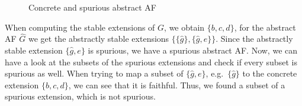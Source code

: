 \begin{example}
\begin{figure}[h]
\begin{subfigure}[t]{0.45\textwidth}
\begin{tikzpicture}
    \end{tikzpicture}
    \label{af:implementationRefutedTheoryB}
    \end{subfigure}%
\caption{Concrete and spurious abstract AF}
\label{fig:AlgorithmRefutedTheoryDefinition}
\end{figure}
\vspace{0.3cm}

When computing the stable extensions of $G$, we obtain $\bigl\{b, c, d\bigl\}$, for the abstract AF $\hat{G}$ we get the abstractly stable extensions $\big\{\{\hat{g}\}, \{\hat{g}, e\}\big\}$. Since the abstractly stable extension $\{\hat{g}, e\}$ is spurious, we have a spurious abstract AF. Now, we can have a look at the subsets of the spurious extensions and check if every subset is spurious as well. When trying to map a subset of $\{\hat{g}, e\}$, e.g.\ $\{\hat{g}\}$ to the concrete extension $\{b, c, d\}$, we can see that it is faithful. Thus, we found a subset of a spurious extension, which is not spurious.
\end{example}